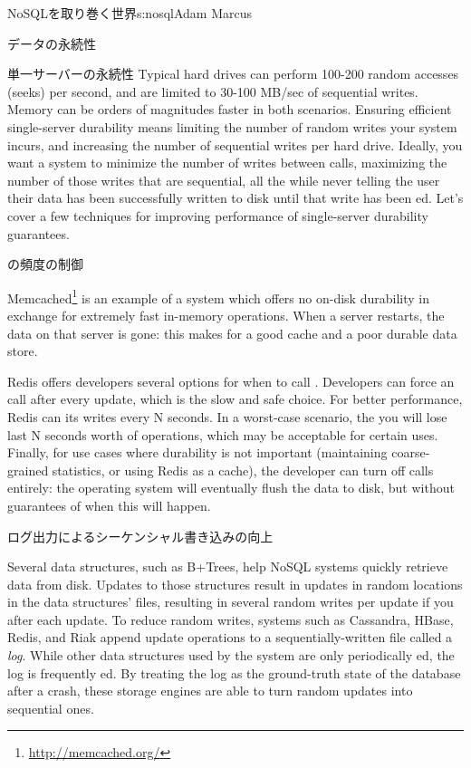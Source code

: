 \begin{aosachapter}{NoSQLを取り巻く世界}{s:nosql}{Adam Marcus}
\begin{aosasect1}{データの永続性}
\begin{aosasect2}{単一サーバーの永続性}
Typical hard drives can perform 100-200 random accesses (seeks) per
second, and are limited to 30-100 MB/sec of sequential writes.  Memory can be orders of magnitudes faster in both scenarios.  Ensuring
efficient single-server durability means limiting the number of random
writes your system incurs, and increasing the number of sequential
writes per hard drive. Ideally, you want a system to minimize the
number of writes between  calls, maximizing the number of
those writes that are sequential, all the while never telling the user
their data has been successfully written to disk until that write has
been ed.  Let's cover a few techniques for improving
performance of single-server durability guarantees.

\begin{aosasect3}{の頻度の制御}

Memcached\footnote{\url{http://memcached.org/}} is an example of a system which offers no on-disk durability
in exchange for extremely fast in-memory operations.  When a server
restarts, the data on that server is gone: this makes for a good cache
and a poor durable data store.

Redis offers developers several options for when to call
. Developers can force an  call after every
update, which is the slow and safe choice.  For better performance,
Redis can  its writes every N seconds.  In a worst-case
scenario, the you will lose last N seconds worth of operations, which
may be acceptable for certain uses.  Finally, for use cases where
durability is not important (maintaining coarse-grained statistics, or
using Redis as a cache), the developer can turn off  calls
entirely: the operating system will eventually flush the data to disk,
but without guarantees of when this will happen.

\end{aosasect3}

\begin{aosasect3}{ログ出力によるシーケンシャル書き込みの向上}

Several data structures, such as B+Trees, help NoSQL systems quickly
retrieve data from disk.  Updates to those structures result in
updates in random locations in the data structures' files, resulting
in several random writes per update if you  after each
update.  To reduce random writes, systems such as Cassandra, HBase,
Redis, and Riak append update operations to a sequentially-written
file called a \emph{log}.  While other data structures used by the
system are only periodically ed, the log is frequently
ed.  By treating the log as the ground-truth state of the
database after a crash, these storage engines are able to turn random
updates into sequential ones.


\end{aosasect3}
\end{aosasect2}
\end{aosasect1}
\end{aosachapter}
